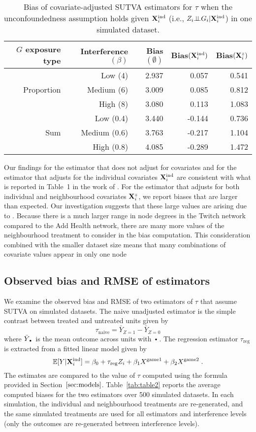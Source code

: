 \documentclass[10pt]{article}
\begin{document}
\begin{table}[ht]
\centering
\begin{tabular}{@{}rrrrr@{}}
\toprule
$G$ exposure type & Interference $(\beta)$ & Bias$(\emptyset)$ & Bias$(\mathbf{X}^{\text{ind}}_i)$ & Bias$(\mathbf{X}_i^z)$ \\
\midrule
\multirow{3}{*}{Proportion} & Low (4) & 2.937 & 0.057 & 0.541 \\
& Medium (6) & 3.009 & 0.085 & 0.812 \\
& High (8) & 3.080 & 0.113 & 1.083 \\[1em]
\multirow{3}{*}{Sum} & Low (0.4) & 3.440 & -0.144 & 0.736 \\
& Medium (0.6) & 3.763 & -0.217 & 1.104 \\
& High (0.8) & 4.085 & -0.289 & 1.472 \\
\bottomrule
\end{tabular}
\caption{Bias of covariate-adjusted SUTVA estimators for $\tau$ when the unconfoundedness assumption holds given $\mathbf{X}^{\text{ind}}_i$ (i.e., $Z_i{\perp\!\!\!\perp} G_i|\mathbf{X}^{\text{ind}}_i$) in one simulated dataset.}
\label{tab:table1}
\end{table}

Our findings for the estimator that does not adjust for covariates and for the estimator that adjusts for the individual covariates $\mathbf{X}^{\text{ind}}_i$ are consistent with what is reported in Table~1 in the work of \textcite{Forastiere:2021}. For the estimator that adjusts for both individual and neighbourhood covariates $\mathbf{X}^z_i$, we report biases that are larger than expected. Our investigation suggests that these large values are arising due to \todo. Because there is a much larger range in node degrees in the Twitch network compared to the Add Health network, there are many more values of the neighbourhood treatment to consider in the bias computation. This consideration combined with the smaller dataset size means that many combinations of covariate values appear in only one node \todo

\subsection{Observed bias and RMSE of estimators}

We examine the observed bias and RMSE of two estimators of $\tau$ that assume SUTVA on simulated datasets. The naive unadjusted estimator is the simple contrast between treated and untreated units given by
\[
\tau_\text{naive} = \bar{Y}_{Z=1} - \bar{Y}_{Z=0}
\]
where $\bar{Y}_{\argdot}$ is the mean outcome across units with $\argdot$. The regression estimator $\tau_\text{reg}$ \parencite{Imbens:2015} is extracted from a fitted linear model given by
\[
\mathbb{E}[Y|\mathbf{X}^{\text{ind}}_i] = \beta_0 + \tau_\text{reg}Z_i + \beta_1X^\text{game1} + \beta_2X^\text{game2} \;.
\]
The estimates are compared to the value of $\tau$ computed using the formula provided in Section~$\ref{sec:models}$. Table~\ref{tab:table2} reports the average computed biases for the two estimators over 500 simulated datasets. In each simulation, the individual and neighbourhood treatments are re-generated, and the same simulated treatments are used for all estimators and interference levels (only the outcomes are re-generated between interference levels).
\end{document}
